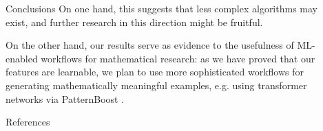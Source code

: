 \documentclass[final,20pt]{beamer}
\newcommand{\todo}[1]{{\color{blue}#1}}
\newlength{\sepwidth}
\newlength{\colwidth}
\newcommand{\separatorcolumn}{\begin{column}{\sepwidth}\end{column}}
\begin{document}
\begin{frame}[t]
\begin{columns}[t]
\begin{column}{\colwidth}
\begin{exampleblock}{Conclusions}
    On one hand, this suggests that less complex algorithms
    may exist, and further research in this direction might be fruitful.

    On the other hand, our results serve as evidence
    to the usefulness of ML-enabled workflows for mathematical research:
    as we have proved that our features are learnable,
    we plan to use more sophisticated workflows for generating
    mathematically meaningful examples, e.g. using
    transformer networks via PatternBoost \cite{2411.00566}.
  \end{exampleblock}






  \begin{block}{References}

  {\footnotesize
  \printbibliography
}
  \end{block}

\end{column}

\separatorcolumn
\end{columns}
\end{frame}
\end{document}
